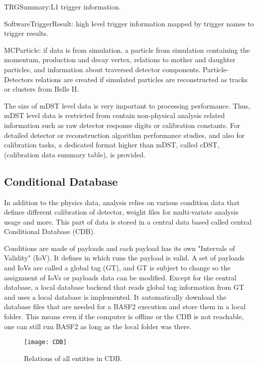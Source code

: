 \textbullet \space TRGSummary:L1 trigger information. 
 
\textbullet \space SoftwareTriggerResult: high level trigger information mapped by trigger names to trigger results. 

\textbullet \space  MCParticle: if data is from simulation, a particle from simulation  containing the
momentum, production and decay vertex, relations
to mother and daughter particles, and information
about traversed detector components. Particle-Detectors relations are
created if simulated particles are reconstructed as
tracks or clusters from Belle II.

The size of mDST level data is very important to processing performance. Thus, mDST level data is restricted from contain non-physical analysis related information such as raw detector response digits or calibration constants. For detailed detector
or reconstruction algorithm performance studies, and also for calibration tasks, a dedicated format higher than mDST, called cDST,
(calibration data summary table), is provided.
 

\subsection{Conditional Database}

In addition to the physics data, analysis relies on various condition data that defines different calibration of detector, weight files for multi-variate analysis usage and more. This part of data is stored in a central data based called central Conditional Database (CDB). 

Conditions are made of payloads and each payload has its own "Intervals of Validity" (IoV). It defines in which runs the payload is valid. A set of payloads and IoVs are called a global tag (GT), and GT is subject to change so the assignment of IoVs or payloads data can be modified. Except for the central database, a local database backend that reads global tag information from GT and uses a local database is implemented. It automatically download the database files that are needed for a BASF2 execution and store them in a local folder. This means even if the computer is offline or the CDB is not reachable, one can still run BASF2 as long as the local folder was there. 

\begin{figure}[htbp]
	\centering
	\texttt{[image: CDB]}
	\caption{ Relations of all entities in CDB. \cite{BASF2} }
\end{figure}

